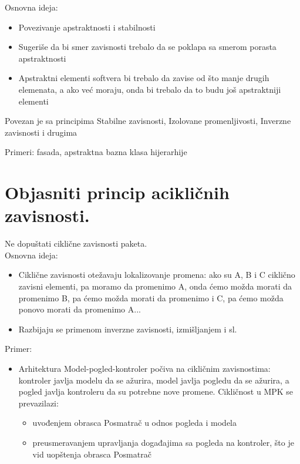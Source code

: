 \documentclass[a4paper]{article}
\begin{document}
Osnovna ideja:
\begin{itemize}
   \item Povezivanje apstraktnosti i stabilnosti
   \item Sugeriše da bi smer zavisnosti trebalo da se poklapa sa smerom porasta apstraktnosti
   \item Apstraktni elementi softvera bi trebalo da zavise od što manje drugih elemenata, a ako već moraju, onda bi trebalo da to budu još apstraktniji elementi\\
\end{itemize}

Povezan je sa principima Stabilne zavisnosti, Izolovane promenljivosti, Inverzne zavisnosti i drugima

Primeri: fasada, apstraktna bazna klasa hijerarhije

\section{Objasniti princip acikličnih zavisnosti.}
Ne dopuštati ciklične zavisnosti paketa.\\

Osnovna ideja:
\begin{itemize}
   \item Ciklične zavisnosti otežavaju lokalizovanje promena: ako su A, B i C ciklično zavisni elementi, pa moramo da promenimo A, onda ćemo možda morati da promenimo B, pa ćemo možda morati da promenimo i C, pa ćemo možda ponovo morati da promenimo A...
   \item Razbijaju se primenom inverzne zavisnosti, izmišljanjem i sl.\\
\end{itemize}
   
Primer:
 \begin{itemize}
 \item Arhitektura Model-pogled-kontroler počiva na cikličnim zavisnostima: kontroler javlja modelu da se ažurira, model javlja pogledu da se ažurira, a pogled javlja kontroleru da su potrebne nove promene. Cikličnost u MPK se prevazilazi:
 \begin{itemize}
    \item uvođenjem obrasca Posmatrač u odnos pogleda i modela
    \item preusmeravanjem upravljanja događajima sa pogleda na kontroler, što je vid uopštenja obrasca Posmatrač
 \end{itemize}
\end{itemize}
\end{document}
